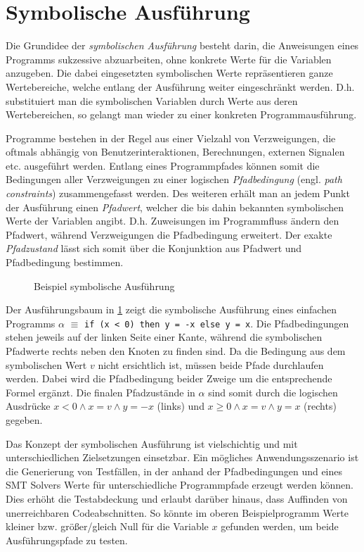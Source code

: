 \section{Symbolische Ausführung}

Die Grundidee der \emph{symbolischen Ausführung} besteht darin, die Anweisungen eines Programms sukzessive abzuarbeiten, ohne konkrete Werte für die Variablen anzugeben. Die dabei eingesetzten symbolischen Werte repräsentieren ganze Wertebereiche, welche entlang der Ausführung weiter eingeschränkt werden. D.h. substituiert man die symbolischen Variablen durch Werte aus deren Wertebereichen, so gelangt man wieder zu einer konkreten Programmausführung.

Programme bestehen in der Regel aus einer Vielzahl von Verzweigungen, die oftmals abhängig von Benutzerinteraktionen, Berechnungen, externen Signalen etc. ausgeführt werden. Entlang eines Programmpfades können somit die Bedingungen aller Verzweigungen zu einer logischen \emph{Pfadbedingung} (engl. \emph{path constraints}) zusammengefasst werden. Des weiteren erhält man an jedem Punkt der Ausführung einen \emph{Pfadwert}, welcher die bis dahin bekannten symbolischen Werte der Variablen angibt. D.h. Zuweisungen im Programmfluss ändern den Pfadwert, während Verzweigungen die Pfadbedingung erweitert. Der exakte \emph{Pfadzustand} lässt sich somit über die Konjunktion aus Pfadwert und Pfadbedingung bestimmen. \cite{Kneuper2008}

\begin{figure}[!hbt]
	\centering
	
	\caption{Beispiel symbolische Ausführung}
	\label{fig:tree}
\end{figure}

\noindent
Der Ausführungsbaum in \cref{fig:tree} zeigt die symbolische Ausführung eines einfachen Programms $\alpha$ $\equiv$ \texttt{if (x < 0) then y = -x else y = x}. Die Pfadbedingungen stehen jeweils auf der linken Seite einer Kante, während die symbolischen Pfadwerte rechts neben den Knoten zu finden sind. Da die Bedingung aus dem symbolischen Wert $v$ nicht ersichtlich ist, müssen beide Pfade durchlaufen werden. Dabei wird die Pfadbedingung beider Zweige um die entsprechende Formel ergänzt. Die finalen Pfadzustände in $\alpha$ sind somit durch die logischen Ausdrücke $x < 0 \wedge x = v \wedge y = -x$ (links) und $x \geq 0 \wedge x = v \wedge y = x$ (rechts) gegeben.

Das Konzept der symbolischen Ausführung ist vielschichtig und mit unterschiedlichen Zielsetzungen einsetzbar. Ein mögliches Anwendungsszenario ist die Generierung von Testfällen, in der anhand der Pfadbedingungen und eines SMT Solvers Werte für unterschiedliche Programmpfade erzeugt werden können. Dies erhöht die Testabdeckung und erlaubt darüber hinaus, dass Auffinden von unerreichbaren Codeabschnitten. So könnte im oberen Beispielprogramm Werte kleiner bzw. größer/gleich Null für die Variable $x$ gefunden werden, um beide Ausführungspfade zu testen.

